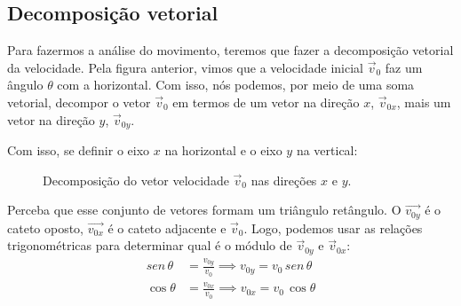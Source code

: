 \documentclass[12pt]{extarticle}
\newcommand{\<}{\langle}
\renewcommand{\>}{\rangle}
\theoremstyle{definition}
\begin{document}
\subsection{Decomposição vetorial}
Para fazermos a análise do movimento, teremos que fazer a decomposição vetorial da velocidade. Pela figura anterior, vimos que a velocidade inicial $\vec{v}_0$ faz um ângulo $\theta$ com a horizontal. Com isso, nós podemos, por meio de uma soma vetorial, decompor o vetor $\vec{v}_0$ em termos de um vetor na direção $x$, $\vec{v}_{0x}$, mais um vetor na direção $y$, $\vec{v}_{0y}$.

Com isso, se definir o eixo $x$ na horizontal e o eixo $y$ na vertical:
\begin{figure}[H]
    \centering
    \caption{Decomposição do vetor velocidade $\vec{v}_0$ nas direções $x$ e $y$.}
    \label{fig:decomposicao}
\end{figure}

Perceba que esse conjunto de vetores formam um triângulo retângulo. O $\vec{v_{0y}}$ é o cateto oposto, $\vec{v_{0x}}$ é o cateto adjacente e $\vec{v}_0$. Logo, podemos usar as relações trigonométricas para determinar qual é o módulo de $\vec{v}_{0y}$ e $\vec{v}_{0x}$:
\begin{align*}
    sen\,\theta &= \frac{v_{0y}}{v_0} \implies v_{0y} = v_0\,sen\,\theta\\
    \cos\theta &= \frac{v_{0x}}{v_0} \implies v_{0x} = v_0\,\cos\theta
\end{align*}
\end{document}
